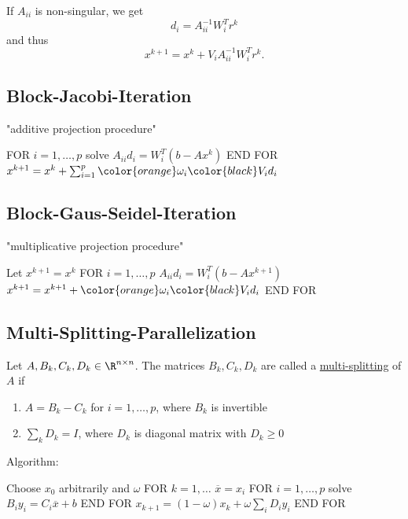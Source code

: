 If $A_{ii}$ is non-singular, we get
\[
d_{i} = A_{ii}^{-1} W_{i}^{T} r^{k}
\] 
and thus
\[
x^{k+1} = x^{k}+ V_{i}A_{ii}^{-1}W_{i}^{T} r^{k}
.\] 


\subsection*{Block-Jacobi-Iteration}
\label{sec:Block-Jacobi-Iteration}
"additive projection procedure"

FOR $i=1, \ldots, p$
	solve $A_{ii}d_{i} = W_{i}^{T}(b-Ax^{k})$
END FOR
$x^{k+1}= x^{k} + \sum_{i=1}^{p}{\color{orange}\omega _{i}\color{black}V_{i}d_{i}}$

\subsection*{Block-Gaus-Seidel-Iteration}
\label{sec:Block-Jacobi-Iteration}
"multiplicative projection procedure"

Let $x^{k+1} = x^{k}$
FOR $i=1, \ldots, p$
	$A_{ii}d_{i} = W_{i}^{T}(b-Ax^{k+1})$
	$x^{k+1} = x^{k+1} +\color{orange}\omega _{i}\color{black} V_{i}d_{i}$
END FOR

\subsection*{Multi-Splitting-Parallelization}
\label{sec:Multi-Splitting-Parallelization}

\begin{definition}
	Let $A, B_{k}, C_{k}, D_{k}\in \R^{n \times n}$.
	The matrices $B_{k}, C_{k}, D_{k}$ are called a \underline{multi-splitting} of $A$ if
	\begin{enumerate}[label=(\arabic{enumi})]
		\item $A = B_{k} - C_{k}$ for $i=1, \ldots, p$, where $B_{k}$ is invertible
		\item $\sum_{k}^{}{D_{k}} = I$, where $D_{k}$ is diagonal matrix with $D_{k} \geq  0$
	\end{enumerate}
\end{definition}

Algorithm:

Choose $x_0$ arbitrarily and $\omega $
FOR $k=1,\ldots $
	$\overline{x} = x_{i}$
	FOR $i=1, \ldots, p$
		solve $B_{i}y_{i} = C_{i}\overline{x} + b$
	END FOR
	$x_{k+1} = (1-\omega ) x_{k} + \omega \sum_{i}^{}{D_{i}y_{i}}$
END FOR


